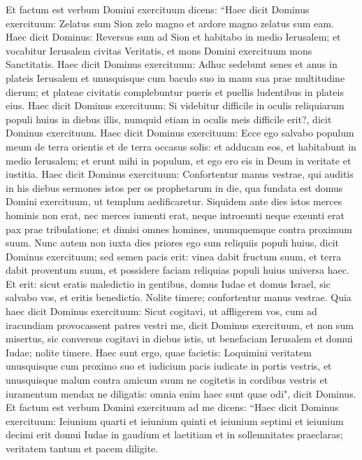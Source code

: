 \begin{biblechapter}  
\verse Et factum est verbum Domini exercituum dicens: 
\verse “Haec dicit Dominus exercituum: Zelatus sum Sion zelo magno et ardore magno zelatus sum eam. 
\verse Haec dicit Dominus: Reversus sum ad Sion et habitabo in medio Ierusalem; et vocabitur Ierusalem civitas Veritatis, et mons Domini exercituum mons Sanctitatis. 
\verse Haec dicit Dominus exercituum: Adhuc sedebunt senes et anus in plateis Ierusalem et unusquisque cum baculo suo in manu sua prae multitudine dierum;  
\verse et plateae civitatis complebuntur pueris et puellis ludentibus in plateis eius. 
\verse Haec dicit Dominus exercituum: Si videbitur difficile in oculis reliquiarum populi huius in diebus illis, numquid etiam in oculis meis difficile erit?, dicit Dominus exercituum. 
\verse Haec dicit Dominus exercituum: Ecce ego salvabo populum meum de terra orientis et de terra occasus solis: 
\verse et adducam eos, et habitabunt in medio Ierusalem; et erunt mihi in populum, et ego ero eis in Deum in veritate et iustitia. 
\verse Haec dicit Dominus exercituum: Confortentur manus vestrae, qui auditis in his diebus sermones istos per os prophetarum in die, qua fundata est domus Domini exercituum, ut templum aedificaretur. 
\verse Siquidem ante dies istos merces hominis non erat, nec merces iumenti erat, neque introeunti neque exeunti erat pax prae tribulatione; et dimisi omnes homines, unumquemque contra proximum suum. 
\verse Nunc autem non iuxta dies priores ego sum reliquiis populi huius, dicit Dominus exercituum; 
\verse sed semen pacis erit: vinea dabit fructum suum, et terra dabit proventum suum, et possidere faciam reliquias populi huius universa haec. 
\verse Et erit: sicut eratis maledictio in gentibus, domus Iudae et domus Israel, sic salvabo vos, et eritis benedictio. Nolite timere; confortentur manus vestrae. 
\verse Quia haec dicit Dominus exercituum: Sicut cogitavi, ut affligerem vos, cum ad iracundiam provocassent patres vestri me, dicit Dominus exercituum, 
\verse et non sum misertus, sic conversus cogitavi in diebus istis, ut benefaciam Ierusalem et domui Iudae; nolite timere. 
\verse Haec sunt ergo, quae facietis: Loquimini veritatem unusquisque cum proximo suo et iudicium pacis iudicate in portis vestris, 
\verse et unusquisque malum contra amicum suum ne cogitetis in cordibus vestris et iuramentum mendax ne diligatis: omnia enim haec sunt quae odi", dicit Dominus. 
\verse Et factum est verbum Domini exercituum ad me dicens: 
\verse “Haec dicit Dominus exercituum: Ieiunium quarti et ieiunium quinti et ieiunium septimi et ieiunium decimi erit domui Iudae in gaudium et laetitiam et in sollemnitates praeclaras; veritatem tantum et pacem diligite. 

\end{biblechapter}
